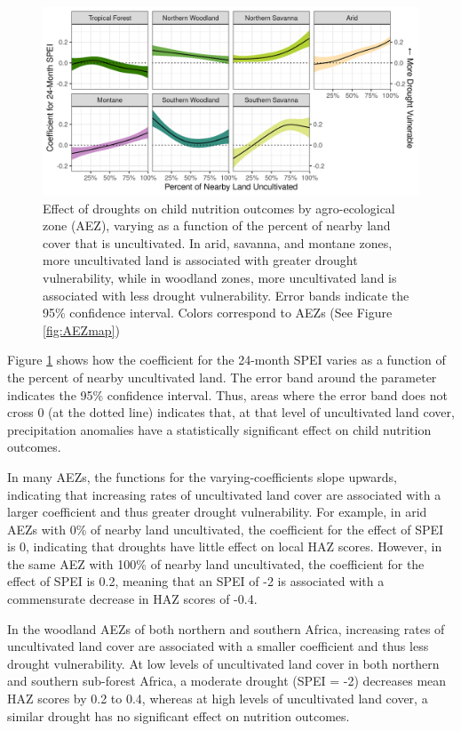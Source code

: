 \documentclass[titlepage]{article}
\begin{document}
\begin{figure}[h!]
	\begin{center}
	\includegraphics[width=\linewidth]{AEZ_effects.png}
	\end{center}
  \caption{Effect of droughts on child nutrition outcomes by agro-ecological zone (AEZ), varying as a function of the percent of nearby land cover that is uncultivated.  In arid, savanna, and montane zones, more uncultivated land is associated with greater drought vulnerability, while in woodland zones, more uncultivated land is associated with less drought vulnerability.  Error bands indicate the 95\% confidence interval. Colors correspond to AEZs (See Figure \ref{fig:AEZmap})}
	\label{fig:naturaleffect}
\end{figure}

Figure \ref{fig:naturaleffect} shows how the coefficient for the 24-month SPEI varies as a function of the percent of nearby uncultivated land.  The error band around the parameter indicates the 95\% confidence interval.  Thus, areas where the error band does not cross 0 (at the dotted line) indicates that, at that level of uncultivated land cover, precipitation anomalies have a statistically significant effect on child nutrition outcomes.

In many AEZs, the functions for the varying-coefficients slope upwards, indicating that increasing rates of uncultivated land cover are associated with a larger coefficient and thus greater drought vulnerability. For example, in arid AEZs with 0\% of nearby land uncultivated, the coefficient for the effect of SPEI is 0, indicating that droughts have little effect on local HAZ scores.  However, in the same AEZ with 100\% of nearby land uncultivated, the coefficient for the effect of SPEI is 0.2, meaning that an SPEI of -2 is associated with a commensurate decrease in HAZ scores of -0.4.

In the woodland AEZs of both northern and southern Africa, increasing rates of uncultivated land cover are associated with a smaller coefficient and thus less drought vulnerability.  At low levels of uncultivated land cover in both northern and southern sub-forest Africa, a moderate drought (SPEI = -2) decreases mean HAZ scores by 0.2 to 0.4, whereas at high levels of uncultivated land cover, a similar drought has no significant effect on nutrition outcomes.
\end{document}

